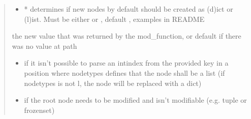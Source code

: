 \documentclass[a4paper,10pt,english]{sphinxmanual}
\begin{document}
\begin{fulllineitems}
\begin{fulllineitems}
\begin{quote}
\begin{description}
\begin{itemize}
\item {}
\sphinxAtStartPar
{} \textendash{} * determines if new nodes by default should be created as (d)ict or (l)ist. Must be
either  or , default , examples in README

\end{itemize}

\sphinxAtStartPar
the new value that was returned by the mod\_function, or default if there was no value at path

\begin{itemize}
\item {}
\sphinxAtStartPar
{} \textendash{} if it isn’t possible to parse an int\sphinxhyphen{}index from the provided key in a position where node\sphinxhyphen{}types
    defines that the node shall be a list (if node\sphinxhyphen{}types is not l, the node will be replaced with a dict)

\item {}
\sphinxAtStartPar
{} \textendash{} if the root node needs to be modified and isn’t modifiable (e.g. tuple or frozenset)

\end{itemize}

\end{description}\end{quote}

\end{fulllineitems}



\end{fulllineitems}
\end{document}
